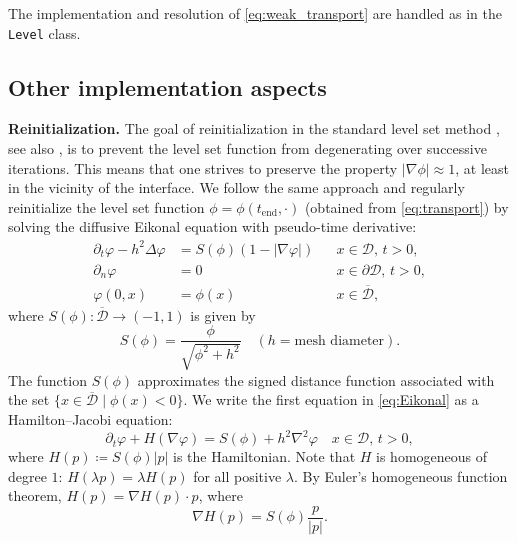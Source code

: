 \documentclass[iicol,pdflatex,sn-mathphys-ay]{sn-jnl}%
\theoremstyle{thmstyleone}%
\theoremstyle{thmstyletwo}%
\theoremstyle{thmstylethree}%
\begin{document}
The implementation and resolution of \eqref{eq:weak_transport} are handled
as in the \texttt{Level} class. 

\subsection{Other implementation aspects}\label{sub:other}

\textbf{Reinitialization.} 
The goal of reinitialization in the standard level set method \cite{MR965860},
see also \cite{MR3843884}, is to prevent the level set function
from degenerating over successive iterations.
This means that one strives to preserve the property $|\nabla\phi|\approx 1$,
at least in the vicinity of the interface.
We follow the same approach and regularly reinitialize the level set function
$\phi = \phi(t_{\text{end}}, \cdot)$ (obtained from \eqref{eq:transport})
by solving the diffusive Eikonal equation with pseudo-time derivative:
\begin{equation}\label{eq:Eikonal}
\begin{aligned}
    \partial_t \varphi - h^2 \Delta \varphi &= S(\phi)(1 - |\nabla \varphi|)
    && x\in \mathcal{D},\, t>0, \\
    \partial_n \varphi &= 0
    && x\in \partial\mathcal{D},\, t>0, \\
	\varphi(0, x) &= \phi(x)
	&& x\in \overline{\mathcal{D}},
\end{aligned}
\end{equation}
where $S(\phi)\colon\overline{\mathcal{D}}\to (-1, 1)$ is given by 
\begin{equation*}
	S(\phi) = \frac{\phi}{\sqrt{\phi^2 + h^2}}\quad (h= \text{mesh diameter}).
\end{equation*}
The function $S(\phi)$ approximates the signed distance function associated
with the set $\{x\in\overline{\mathcal{D}} \mid \phi(x)<0\}$.
We write the first equation in \eqref{eq:Eikonal}
as a Hamilton--Jacobi equation:
\begin{equation}\label{eq:HJ}
	\partial_t \varphi + H(\nabla \varphi) =
	S(\phi) + h^2 \nabla^2\varphi \quad x\in \mathcal{D},\, t>0,
\end{equation}
where $H(p) \coloneqq S(\phi) |p|$ is the Hamiltonian.
Note that $H$ is homogeneous of degree $1$: $H(\lambda p) = \lambda H(p)$
for all positive $\lambda$. By Euler's homogeneous function theorem,
$H(p) = \nabla H (p) \cdot p$, where
\begin{equation}\label{eq:grad_H}
	\nabla H (p) = S(\phi)\frac{p}{|p|}.
\end{equation}
\end{document}
